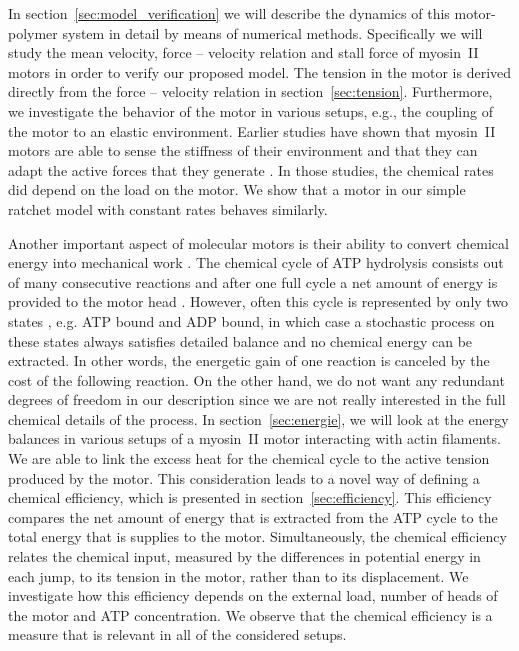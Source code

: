 \documentclass[aps,pre,twocolumn,showpacs,showkeys,superscriptaddress,floatfix]{revtex4-1}
\begin{document}
In section~\ref{sec:model_verification} we will describe the dynamics of this motor-polymer system in detail by means of numerical methods.
Specifically we will study the mean velocity, force -- velocity relation and stall force of myosin~II motors in order to verify our proposed model. 
The tension in the motor is derived directly from the force -- velocity relation in section~\ref{sec:tension}.
Furthermore, we investigate the behavior of the motor in various setups, e.g., the coupling of the motor to an elastic environment.
Earlier studies have shown that myosin~II motors are able to sense the stiffness of their environment and that they can adapt the active forces that they generate \cite{stam2015isoforms,Albert2014}.
In those studies, the chemical rates did depend on the load on the motor. 
We show that a motor in our simple ratchet model with constant rates behaves similarly.

Another important aspect of molecular motors is their ability to convert chemical energy into mechanical work \cite{astumian1996mechanochemical}.
The chemical cycle of ATP hydrolysis consists out of many consecutive reactions and after one full cycle a net amount of energy is provided to the motor head \cite{gajewski1986thermodynamics}.
However, often this cycle is represented by only two states \cite{julicher1997modeling,Reimann2002introduction}, e.g. ATP bound and ADP bound, 
in which case a stochastic process on these states always satisfies detailed balance and no chemical energy can be extracted. 
In other words, the energetic gain of one reaction is canceled by the cost of the following reaction.
On the other hand, we do not want any redundant degrees of freedom in our description since we are not really interested in the full chemical details of the process.
In section~\ref{sec:energie}, we will look at the energy balances in various setups of a myosin~II motor interacting with actin filaments.
We are able to link the excess heat for the chemical cycle to the active tension produced by the motor.
This consideration leads to a novel way of defining a chemical efficiency, which is presented in section~\ref{sec:efficiency}. 
This efficiency compares the net amount of energy that is extracted from the ATP cycle to the total energy that is supplies to the motor.
Simultaneously, the chemical efficiency relates the chemical input, measured by the differences in potential energy in each jump, to its tension in the motor, rather than to its displacement.
We investigate how this efficiency depends on the external load, number of heads of the motor and ATP concentration. 
We observe that the chemical efficiency is a measure that is relevant in all of the considered setups.
\end{document}
